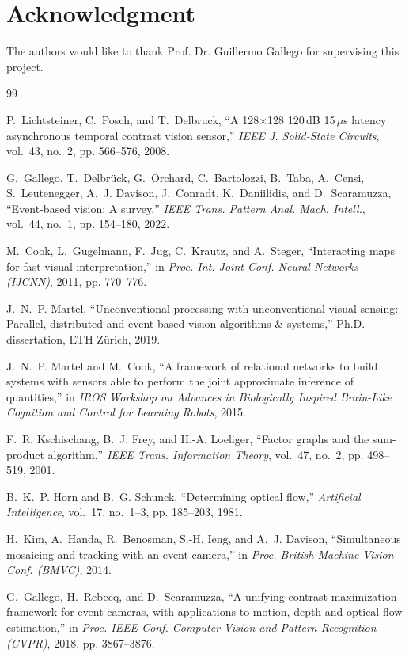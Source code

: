 \documentclass[journal]{IEEEtran}
\begin{document}
\section*{Acknowledgment}
The authors would like to thank Prof. Dr. Guillermo Gallego for supervising this project.


\begin{thebibliography}{99}

P.~Lichtsteiner, C.~Posch, and T.~Delbruck, ``A 128$\times$128 120\,dB
15\,$\mu$s latency asynchronous temporal contrast vision sensor,''
\emph{IEEE J. Solid-State Circuits}, vol.~43, no.~2, pp. 566--576, 2008.

G.~Gallego, T.~Delbr\"uck, G.~Orchard, C.~Bartolozzi, B.~Taba, A.~Censi,
S.~Leutenegger, A.~J. Davison, J.~Conradt, K.~Daniilidis, and D.~Scaramuzza,
``Event-based vision: A survey,'' \emph{IEEE Trans. Pattern Anal. Mach.
Intell.}, vol.~44, no.~1, pp. 154--180, 2022.

M.~Cook, L.~Gugelmann, F.~Jug, C.~Krautz, and A.~Steger, ``Interacting maps for
fast visual interpretation,'' in \emph{Proc. Int. Joint Conf. Neural Networks
(IJCNN)}, 2011, pp. 770--776.

J.~N.~P. Martel, ``Unconventional processing with unconventional visual sensing:
Parallel, distributed and event based vision algorithms \& systems,'' Ph.D.
dissertation, ETH Z\"urich, 2019.

J.~N.~P. Martel and M.~Cook, ``A framework of relational networks to build
systems with sensors able to perform the joint approximate inference of
quantities,'' in \emph{IROS Workshop on Advances in Biologically Inspired
Brain-Like Cognition and Control for Learning Robots}, 2015.

F.~R. Kschischang, B.~J. Frey, and H.-A. Loeliger, ``Factor graphs and the
sum-product algorithm,'' \emph{IEEE Trans. Information Theory}, vol.~47, no.~2,
pp. 498--519, 2001.

B.~K.~P. Horn and B.~G. Schunck, ``Determining optical flow,'' \emph{Artificial
Intelligence}, vol.~17, no.~1--3, pp. 185--203, 1981.

H.~Kim, A.~Handa, R.~Benosman, S.-H. Ieng, and A.~J. Davison, ``Simultaneous
mosaicing and tracking with an event camera,'' in \emph{Proc. British Machine
Vision Conf. (BMVC)}, 2014.

G.~Gallego, H.~Rebecq, and D.~Scaramuzza, ``A unifying contrast maximization
framework for event cameras, with applications to motion, depth and optical flow
estimation,'' in \emph{Proc. IEEE Conf. Computer Vision and Pattern Recognition
(CVPR)}, 2018, pp. 3867--3876.


\end{thebibliography}
\end{document}

